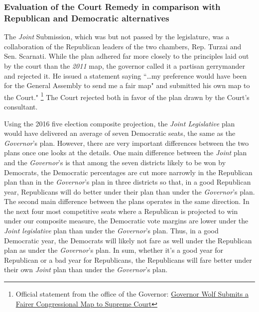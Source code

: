 \subsubsection*{Evaluation of the Court Remedy in comparison with Republican and Democratic alternatives}
%
The \textit{Joint} Submission, which was  but not passed by the legislature, was a collaboration of the Republican leaders of the two chambers, Rep. Turzai and Sen. Scarnati. While the plan adhered far more closely to the principles laid out by the court than the \textit{2011} map, the governor called it a partisan gerrymander and rejected it. He issued a statement saying ``\dots my preference would have been for the General Assembly to send me a fair map" and submitted his own map to the Court."
        \footnote{Official statement from the office of the Governor: \href{https://bit.ly/2CqIg88}{Governor Wolf Submits a Fairer Congressional Map to Supreme Court}}
The Court rejected both in favor of the plan drawn by the Court’s consultant.
\par
Using the 2016 five election composite projection, the \textit{Joint Legislative} plan would have delivered an average of seven Democratic seats, the same as the \textit{Governor}’s plan. However, there are very important differences between the two plans once one looks at the details. One main difference between the \textit{Joint} plan and the \textit{Governor}’s is that among the seven districts likely to be won by Democrats, the Democratic percentages are cut more narrowly in the Republican plan than in the \textit{Governor}’s plan in three districts so that, in a good Republican year, Republicans will do better under their plan than under the \textit{Governor}’s plan. The second main difference between the plans operates in the same direction. In the next four most competitive seats where a Republican is projected to win under our composite measure, the Democratic vote margins are lower under the \textit{Joint legislative} plan than under the \textit{Governor}’s plan. Thus, in a good Democratic year, the Democrats will likely not fare as well under the Republican plan as under the \textit{Governor}’s plan. In sum, whether it’s a good year for Republican or a bad year for Republicans, the Republicans will fare better under their own \textit{Joint} plan than under the \textit{Governor}’s plan.
%
